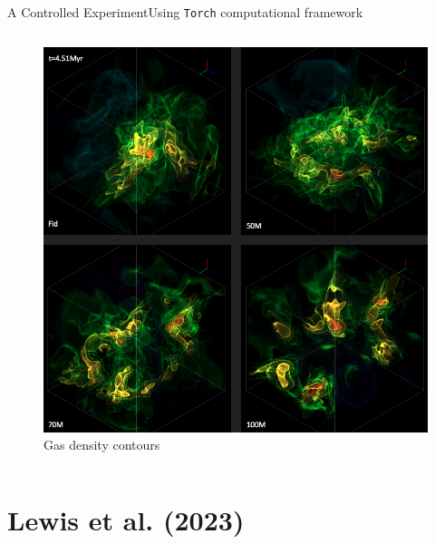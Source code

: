 \documentclass[aspectratio=169]{beamer}
\begin{document}
\begin{frame}{A Controlled Experiment}{Using \texttt{Torch} computational framework}
\begin{columns}
\begin{column}{0.35\textwidth}
            \begin{figure}[h!]
                \centering
                \includegraphics[width=\linewidth]{../images/paper1-snapshot-volume-render.png} \\
		Gas density contours
                \label{fig:volume}
            \end{figure}
        \end{column}
    \end{columns}
\end{frame} 

\section{Lewis et al. (2023)}
\end{document}
